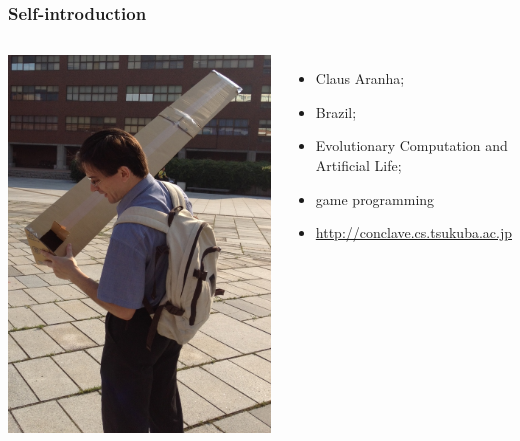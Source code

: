 \documentclass{beamer}
\begin{document}
\begin{frame}
  \frametitle{Self-introduction}
  \begin{columns}
    \includegraphics[width=1\textwidth]{../img/pinhole}
           {\small
             \begin{itemize}
             \item {} Claus Aranha;
               \medskip

             \item {} Brazil;
               \medskip

             \item {} Evolutionary Computation and Artificial Life;
               \medskip

             \item {} game programming
               \medskip

             \item {}
               \url{http://conclave.cs.tsukuba.ac.jp}
             \end{itemize}
           }
  \end{columns}
\end{frame}
\end{document}
